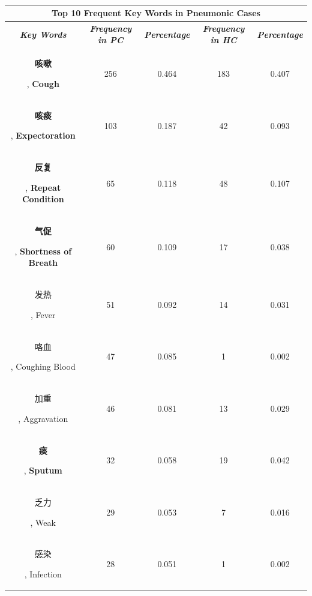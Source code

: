 \documentclass[journal]{IEEEtran}
\begin{document}
\begin{table}[htb]
    \vspace{-0cm}
\caption{}
\vspace{-0cm}
\begin{center}
\begin{tabular}{c|c|c|c|c}
\multicolumn{5}{c}{\textbf{Top 10 Frequent Key Words in Pneumonic Cases}} \\
\hline
    \textbf{\textit{Key Words}} & \textbf{\textit{Frequency in PC}} & \textbf{\textit{Percentage}}& \textbf{\textit{Frequency in HC}}& \textbf{\textit{Percentage}} \\
\hline
\begin{CJK}{UTF8}{gbsn}\textbf{咳嗽}\end{CJK}, \textbf{Cough} & 256 & 0.464 & 183 & 0.407\\
\begin{CJK}{UTF8}{gbsn}\textbf{咳痰}\end{CJK}, \textbf{Expectoration} & 103 & 0.187 & 42 & 0.093\\
\begin{CJK}{UTF8}{gbsn}\textbf{反复}\end{CJK}, \textbf{Repeat Condition} & 65 & 0.118 & 48 & 0.107\\
\begin{CJK}{UTF8}{gbsn}\textbf{气促}\end{CJK}, \textbf{Shortness of Breath} & 60 & 0.109 & 17 & 0.038\\
\begin{CJK}{UTF8}{gbsn}发热\end{CJK}, Fever & 51 & 0.092 & 14 & 0.031\\
\begin{CJK}{UTF8}{gbsn}咯血\end{CJK}, Coughing Blood & 47 & 0.085 & 1 & 0.002\\
\begin{CJK}{UTF8}{gbsn}加重\end{CJK}, Aggravation & 46 & 0.081 & 13 & 0.029\\
\begin{CJK}{UTF8}{gbsn}\textbf{痰}\end{CJK}, \textbf{Sputum} & 32 & 0.058 & 19 & 0.042\\
\begin{CJK}{UTF8}{gbsn}乏力\end{CJK}, Weak& 29 & 0.053 & 7 & 0.016\\
\begin{CJK}{UTF8}{gbsn}感染\end{CJK}, Infection& 28 & 0.051 & 1 & 0.002\\



\end{tabular}
\end{center}
\end{table}
\end{document}
